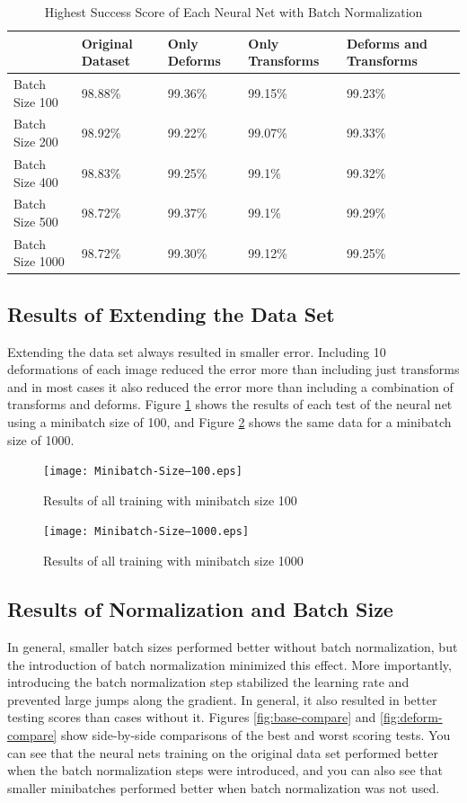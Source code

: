 \documentclass{article}
\begin{document}
\begin{table}[t]
  \caption{Highest Success Score of Each Neural Net with Batch Normalization}
  \centering
  \begin{tabular}{lllll}
    \toprule
    & Original Dataset & Only Deforms & Only Transforms & Deforms and Transforms \\
    \midrule
    Batch Size 100 & 98.88\% & 99.36\% & 99.15\% & 99.23\% \\
    Batch Size 200 & 98.92\% & 99.22\% & 99.07\% & 99.33\% \\
    Batch Size 400 & 98.83\% & 99.25\% & 99.1\% & 99.32\% \\
    Batch Size 500 & 98.72\% & 99.37\% & 99.1\% & 99.29\% \\
    Batch Size 1000 & 98.72\% & 99.30\% & 99.12\% & 99.25\% \\
    \bottomrule
  \end{tabular}
  \label{table:batch}
\end{table}

\subsection{Results of Extending the Data Set}
Extending the data set always resulted in smaller error. Including 10 deformations of each image reduced the error more than including just transforms and in most cases it also reduced the error more than including a combination of transforms and deforms. Figure \ref{fig:small-minibatch} shows the results of each test of the neural net using a minibatch size of 100, and Figure \ref{fig:large-minibatch} shows the same data for a minibatch size of 1000.

\begin{figure}
  \centering
  \texttt{[image: Minibatch-Size---100.eps]}
  \caption{Results of all training with minibatch size 100}
  \label{fig:small-minibatch}
\end{figure}
\begin{figure}
  \centering
  \texttt{[image: Minibatch-Size---1000.eps]}
  \caption{Results of all training with minibatch size 1000}
  \label{fig:large-minibatch}
\end{figure}

\subsection{Results of Normalization and Batch Size}
In general, smaller batch sizes performed better without batch normalization, but the introduction of batch normalization minimized this effect. More importantly, introducing the batch normalization step stabilized the learning rate and prevented large jumps along the gradient. In general, it also resulted in better testing scores than cases without it. Figures \ref{fig:base-compare} and \ref{fig:deform-compare} show side-by-side comparisons of the best and worst scoring tests. You can see that the neural nets training on the original data set performed better when the batch normalization steps were introduced, and you can also see that smaller minibatches performed better when batch normalization was not used.
\end{document}

